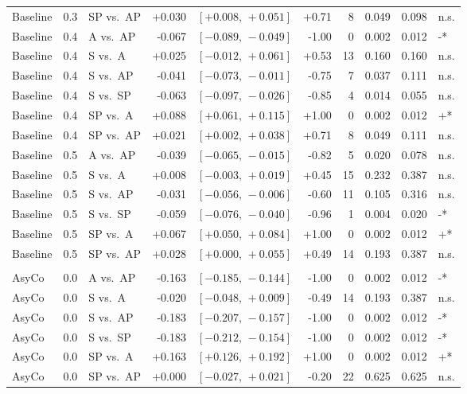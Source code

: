 \begin{landscape}
\begin{scriptsize}
\begin{longtable}{lllrrrrrrl}
Baseline & 0.3 & SP vs.\ AP & +0.030 & $[+0.008,\,+0.051]$ & +0.71 & 8 & 0.049 & 0.098 & n.s. \\
Baseline & 0.4 & A vs.\ AP & -0.067 & $[-0.089,\,-0.049]$ & -1.00 & 0 & 0.002 & 0.012 & -* \\
Baseline & 0.4 & S vs.\ A & +0.025 & $[-0.012,\,+0.061]$ & +0.53 & 13 & 0.160 & 0.160 & n.s. \\
Baseline & 0.4 & S vs.\ AP & -0.041 & $[-0.073,\,-0.011]$ & -0.75 & 7 & 0.037 & 0.111 & n.s. \\
Baseline & 0.4 & S vs.\ SP & -0.063 & $[-0.097,\,-0.026]$ & -0.85 & 4 & 0.014 & 0.055 & n.s. \\
Baseline & 0.4 & SP vs.\ A & +0.088 & $[+0.061,\,+0.115]$ & +1.00 & 0 & 0.002 & 0.012 & +* \\
Baseline & 0.4 & SP vs.\ AP & +0.021 & $[+0.002,\,+0.038]$ & +0.71 & 8 & 0.049 & 0.111 & n.s. \\
Baseline & 0.5 & A vs.\ AP & -0.039 & $[-0.065,\,-0.015]$ & -0.82 & 5 & 0.020 & 0.078 & n.s. \\
Baseline & 0.5 & S vs.\ A & +0.008 & $[-0.003,\,+0.019]$ & +0.45 & 15 & 0.232 & 0.387 & n.s. \\
Baseline & 0.5 & S vs.\ AP & -0.031 & $[-0.056,\,-0.006]$ & -0.60 & 11 & 0.105 & 0.316 & n.s. \\
Baseline & 0.5 & S vs.\ SP & -0.059 & $[-0.076,\,-0.040]$ & -0.96 & 1 & 0.004 & 0.020 & -* \\
Baseline & 0.5 & SP vs.\ A & +0.067 & $[+0.050,\,+0.084]$ & +1.00 & 0 & 0.002 & 0.012 & +* \\
Baseline & 0.5 & SP vs.\ AP & +0.028 & $[+0.000,\,+0.055]$ & +0.49 & 14 & 0.193 & 0.387 & n.s. \\
\addlinespace
\multicolumn{10}{l}{\textit{Macro F1}} \\
AsyCo & 0.0 & A vs.\ AP & -0.163 & $[-0.185,\,-0.144]$ & -1.00 & 0 & 0.002 & 0.012 & -* \\
AsyCo & 0.0 & S vs.\ A & -0.020 & $[-0.048,\,+0.009]$ & -0.49 & 14 & 0.193 & 0.387 & n.s. \\
AsyCo & 0.0 & S vs.\ AP & -0.183 & $[-0.207,\,-0.157]$ & -1.00 & 0 & 0.002 & 0.012 & -* \\
AsyCo & 0.0 & S vs.\ SP & -0.183 & $[-0.212,\,-0.154]$ & -1.00 & 0 & 0.002 & 0.012 & -* \\
AsyCo & 0.0 & SP vs.\ A & +0.163 & $[+0.126,\,+0.192]$ & +1.00 & 0 & 0.002 & 0.012 & +* \\
AsyCo & 0.0 & SP vs.\ AP & +0.000 & $[-0.027,\,+0.021]$ & -0.20 & 22 & 0.625 & 0.625 & n.s. \\

\end{longtable}
\end{scriptsize}
\end{landscape}
